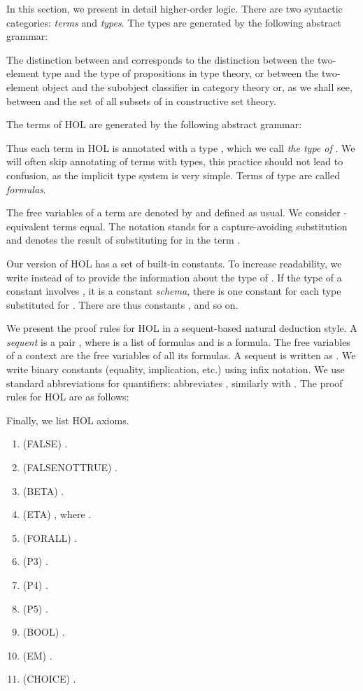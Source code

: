 \documentclass{LMCS}
\begin{document}
In this section, we present in detail higher-order logic. 
There are two syntactic categories: \emph{terms} and \emph{types}. The types are 
generated by the following abstract grammar:

The distinction between  and  corresponds to the distinction
between the two-element type and the type of propositions in type theory, or
between the two-element object and the subobject classifier in category theory or,
as we shall see, between  and the set of all subsets of  in constructive set theory.

The terms of HOL are generated by the following abstract grammar:


Thus each term  in HOL is annotated with a type , which we
call \emph{the type of }. We will often skip annotating of terms with
types, this practice should not lead to confusion, as the implicit type
system is very simple. Terms of type  are called \emph{formulas}. 

The free variables of a term  are denoted by  and defined as
usual. We consider -equivalent terms equal. The notation 
stands for a capture-avoiding substitution and denotes the result of
substituting  for  in the term . 

Our version of HOL has a set of built-in constants. To increase readability,
we write  instead of  to provide the information about the
type of . If the type of a constant involves
, it is a constant \emph{schema}, there is one constant for each
type  substituted for . There are thus constants ,
 and so on. 





We present the proof rules for HOL in a sequent-based natural deduction
style. A \emph{sequent} is a pair , where  is a list of formulas
and  is a formula. The free variables of a context are the free variables of
all its formulas. A sequent  is written as .
We write binary constants (equality, implication, etc.) using infix notation. We use standard abbreviations for
quantifiers:  abbreviates , 
similarly with . The proof rules for HOL are as
follows:





\newpage
Finally, we list HOL axioms.

\begin{enumerate}[(1)]
\item (FALSE) .
\item (FALSENOTTRUE) . 
\item (BETA) .
\item (ETA) , where . 
\item (FORALL) .
\item (P3) . 
\item (P4) .
\item (P5) .
\item (BOOL) .
\item (EM) .
\item (CHOICE) . 
\end{enumerate}	
\end{document}
